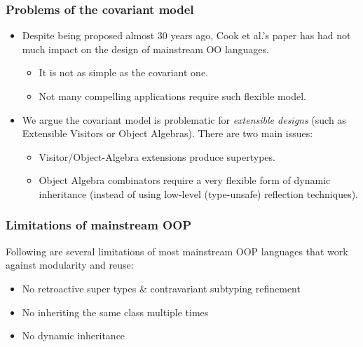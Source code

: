 \documentclass{beamer}
\begin{document}
\begin{frame}
  \frametitle{Problems of the covariant model}

  \begin{itemize}
  \item Despite being proposed almost 30 years ago, Cook et al.'s paper has had not
    much impact on the design of mainstream OO languages.
    \begin{itemize}
    \item It is not as simple as the covariant one.
    \item Not many compelling applications require such flexible model.
    \end{itemize}

  \item We argue the covariant model is problematic for \textit{extensible
      designs} (such as Extensible Visitors or Object Algebras). There are two
    main issues:
    \begin{itemize}
    \item Visitor/Object-Algebra extensions produce supertypes.
    \item Object Algebra combinators require a very flexible form of dynamic
      inheritance (instead of using low-level (type-unsafe) reflection
      techniques).
    \end{itemize}


  \end{itemize}

\end{frame}


\begin{frame}[fragile]
  \frametitle{Limitations of mainstream OOP}

  Following are several limitations of most mainstream OOP languages that work
  against modularity and reuse:

  \begin{alertblock}{}
  \begin{itemize}
  \item No retroactive super types \& contravariant subtyping refinement
  \item No inheriting the same class multiple times
  \item No dynamic inheritance
  \end{itemize}


  \end{alertblock}


\end{frame}
\end{document}
